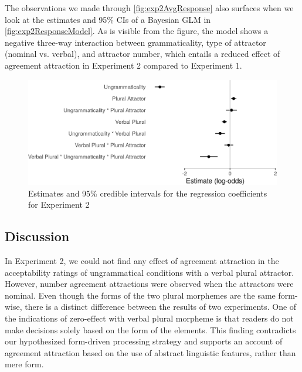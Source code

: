 \documentclass[a4paper,man,natbib]{apa6}\usepackage[]{graphicx}\usepackage[]{color}
\begin{document}
The observations we made through \autoref{fig:exp2AvgResponse} also surfaces when we look at the estimates and 95\% CIs of a Bayesian GLM in \autoref{fig:exp2ResponseModel}. As is visible from the figure, the model shows a negative three-way interaction between grammaticality, type of attractor (nominal vs. verbal), and attractor number, which entails a reduced effect of agreement attraction in Experiment 2 compared to Experiment 1. 

\begin{figure}[h]
\centering
\includegraphics[width=\textwidth]{figures/exp2ResponseModelPlot-1.png}
\caption{Estimates and 95\% credible intervals for the regression coefficients for Experiment 2}
\label{fig:exp2ResponseModel}
\end{figure}


\subsection{Discussion} \label{sec:exp2:discussion}


In Experiment 2, we could not find any effect of agreement attraction in the acceptability ratings of ungrammatical conditions with a verbal plural attractor. However, number agreement attractions were observed when the attractors were nominal. Even though the forms of the two plural morphemes are the same form-wise, there is a distinct difference between the results of two experiments. One of the indications of zero-effect with verbal plural morpheme is that readers do not make decisions solely based on the form of the elements. This finding contradicts our hypothesized form-driven processing strategy and supports an account of agreement attraction based on the use of abstract linguistic features, rather than mere form.
\end{document}
